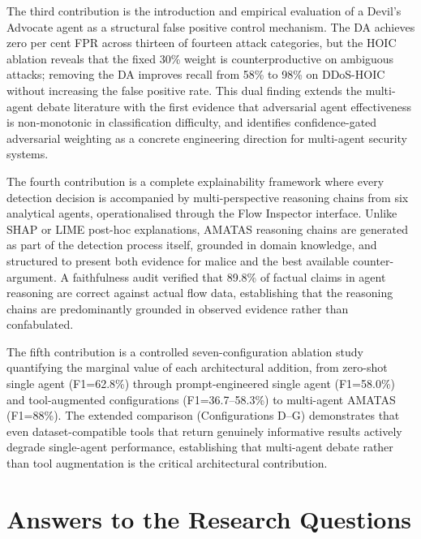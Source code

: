 \documentclass[../main.tex]{subfiles}
\begin{document}
The third contribution is the introduction and empirical evaluation of a Devil's Advocate agent as a structural false positive control mechanism. The DA achieves zero per cent FPR across thirteen of fourteen attack categories, but the HOIC ablation reveals that the fixed 30\% weight is counterproductive on ambiguous attacks; removing the DA improves recall from 58\% to 98\% on DDoS-HOIC without increasing the false positive rate. This dual finding extends the multi-agent debate literature \autocite{Yin2024, Du2023, Chan2023} with the first evidence that adversarial agent effectiveness is non-monotonic in classification difficulty, and identifies confidence-gated adversarial weighting as a concrete engineering direction for multi-agent security systems.

The fourth contribution is a complete explainability framework where every detection decision is accompanied by multi-perspective reasoning chains from six analytical agents, operationalised through the Flow Inspector interface. Unlike SHAP or LIME post-hoc explanations, AMATAS reasoning chains are generated as part of the detection process itself, grounded in domain knowledge, and structured to present both evidence for malice and the best available counter-argument. A faithfulness audit verified that 89.8\% of factual claims in agent reasoning are correct against actual flow data, establishing that the reasoning chains are predominantly grounded in observed evidence rather than confabulated.

The fifth contribution is a controlled seven-configuration ablation study quantifying the marginal value of each architectural addition, from zero-shot single agent (F1=62.8\%) through prompt-engineered single agent (F1=58.0\%) and tool-augmented configurations (F1=36.7--58.3\%) to multi-agent AMATAS (F1=88\%). The extended comparison (Configurations D--G) demonstrates that even dataset-compatible tools that return genuinely informative results actively degrade single-agent performance, establishing that multi-agent debate rather than tool augmentation is the critical architectural contribution.

\section{Answers to the Research Questions}
\end{document}
